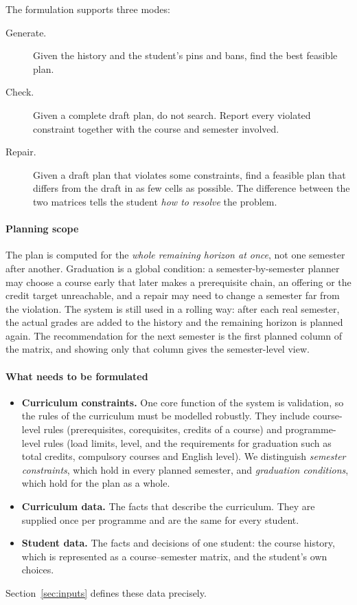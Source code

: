 The formulation supports three modes:
\begin{description}
      \item[Generate.] Given the history and the student's pins and bans, find the best feasible plan.
      \item[Check.] Given a complete draft plan, do not search. Report every violated constraint together with the course and semester involved.
      \item[Repair.] Given a draft plan that violates some constraints, find a feasible plan that differs from the draft in as few cells as possible. The difference between the two matrices tells the student \emph{how to resolve} the problem.
\end{description}

\paragraph{Planning scope}
The plan is computed for the \emph{whole remaining horizon at once}, not one semester after another. Graduation is a global condition: a semester-by-semester planner may choose a course early that later makes a prerequisite chain, an offering or the credit target unreachable, and a repair may need to change a semester far from the violation. The system is still used in a rolling way: after each real semester, the
actual grades are added to the history and the remaining horizon is planned again. The recommendation for the next semester is the first planned column of the matrix, and showing only that column gives the semester-level view.

\paragraph{What needs to be formulated}
\begin{itemize}
      \item \textbf{Curriculum constraints.} One core function of the system is validation, so the rules of the curriculum must be modelled robustly. They include course-level rules (prerequisites, corequisites, credits of a course) and programme-level rules (load limits, level, and the requirements for graduation such as total credits, compulsory courses and English level). We distinguish \emph{semester constraints}, which hold in every planned semester, and \emph{graduation conditions}, which hold for the plan as a whole.
      \item \textbf{Curriculum data.} The facts that describe the curriculum. They are supplied once per programme and are the same for every student.
      \item \textbf{Student data.} The facts and decisions of one student: the course history, which is represented as a course--semester matrix, and the student's own choices.
\end{itemize}
Section~\ref{sec:inputs} defines these data precisely.

